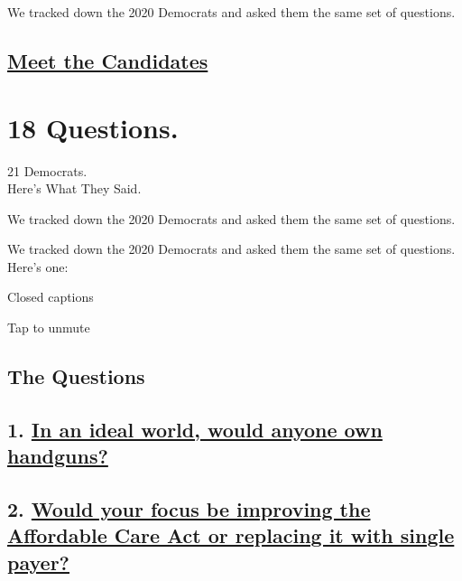 We tracked down the 2020 Democrats and asked them the same set of
questions.

\hypertarget{meet-the-candidates}{%
\subsection{\texorpdfstring{\href{https://www.nytimes.com/interactive/2019/us/politics/2020-candidate-interviews.html}{Meet
the Candidates}}{Meet the Candidates}}\label{meet-the-candidates}}

\hypertarget{18-questions}{%
\section{18 Questions.}\label{18-questions}}

21 Democrats.\\
Here's What They Said.

We tracked down the 2020 Democrats and asked them the same set of
questions.

We tracked down the 2020 Democrats and asked them the same set of
questions. Here's one:

Closed captions

Tap to unmute

\hypertarget{the-questions}{%
\subsection{The Questions}\label{the-questions}}

\hypertarget{1-in-an-ideal-world-would-anyone-own-handguns}{%
\subsection{\texorpdfstring{1.
\href{https://www.nytimes.com/interactive/2019/us/politics/gun-control-democratic-candidates.html}{In
an ideal world, would anyone own
handguns?}}{1. In an ideal world, would anyone own handguns?}}\label{1-in-an-ideal-world-would-anyone-own-handguns}}

\hypertarget{2-would-your-focus-be-improving-the-affordable-care-act-or-replacing-it-with-single-payer}{%
\subsection{\texorpdfstring{2.
\href{https://www.nytimes.com/interactive/2019/us/politics/obamacare-democratic-candidates.html}{Would
your focus be improving the Affordable Care Act or replacing it with
single
payer?}}{2. Would your focus be improving the Affordable Care Act or replacing it with single payer?}}\label{2-would-your-focus-be-improving-the-affordable-care-act-or-replacing-it-with-single-payer}}

